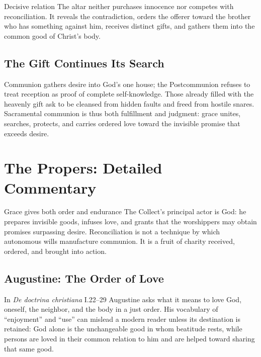 \begin{deepstudy}
\begin{massbox}{Decisive relation}
The altar neither purchases innocence nor competes with reconciliation. It reveals the contradiction, orders the offerer toward the brother who has something against him, receives distinct gifts, and gathers them into the common good of Christ's body.
\end{massbox}

\sectionguard
\subsection*{The Gift Continues Its Search\enspace{}}

Communion gathers desire into God's one house; the Postcommunion refuses to treat reception as proof of complete self-knowledge. Those already filled with the heavenly gift ask to be cleansed from hidden faults and freed from hostile snares. Sacramental communion is thus both fulfillment and judgment: grace unites, searches, protects, and carries ordered love toward the invisible promise that exceeds desire.

\newpage
\section*{The Propers: Detailed Commentary}

\begin{massbox}{Grace gives both order and endurance\enspace{}}
The Collect's principal actor is God: he prepares invisible goods, infuses love, and grants that the worshippers may obtain promises surpassing desire. Reconciliation is not a technique by which autonomous wills manufacture communion. It is a fruit of charity received, ordered, and brought into action.
\end{massbox}

\sectionguard
\subsection*{Augustine: The Order of Love\enspace{}}

In \emph{De doctrina christiana} I.22--29 Augustine asks what it means to love God, oneself, the neighbor, and the body in a just order. His vocabulary of ``enjoyment'' and ``use'' can mislead a modern reader unless its destination is retained: God alone is the unchangeable good in whom beatitude rests, while persons are loved in their common relation to him and are helped toward sharing that same good.


\end{deepstudy}
